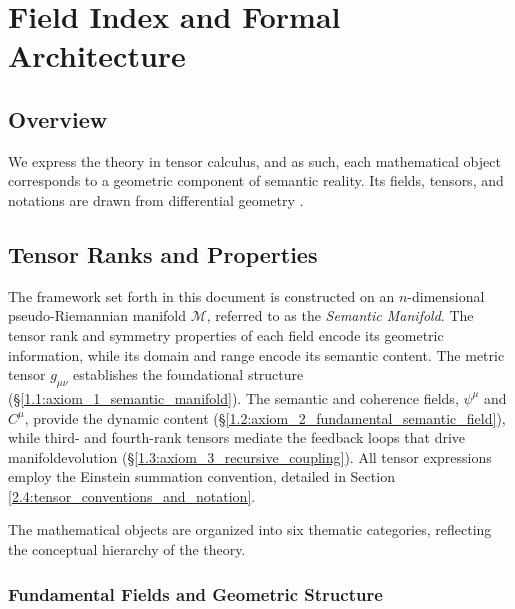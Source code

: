 \chapter{Field Index and Formal Architecture}
\label{2:field_index_and_formal_architecture}


\section{Overview}
\label{2.1:overview}

We express the theory in tensor calculus, and as such, each mathematical object corresponds to a geometric component of semantic reality. Its fields, tensors, and notations are drawn from differential geometry \autocite{Riemann1868, Lee2003}.


\section{Tensor Ranks and Properties}
\label{2.2:tensor_ranks_and_properties}

The framework set forth in this document is constructed on an \(n\)-dimensional pseudo-Riemannian manifold \(\mathcal{M}\), referred to as the \textit{Semantic Manifold}. The tensor rank and symmetry properties of each field encode its geometric information, while its domain and range encode its semantic content. The metric tensor \(g_{\mu\nu}\) establishes the foundational structure (\S\ref{1.1:axiom_1_semantic_manifold}). The semantic and coherence fields, \(\psi^\mu\) and \(C^\mu\), provide the dynamic content (\S\ref{1.2:axiom_2_fundamental_semantic_field}), while third- and fourth-rank tensors mediate the feedback loops that drive manifoldevolution (\S\ref{1.3:axiom_3_recursive_coupling}). All tensor expressions employ the Einstein summation convention, detailed in Section \ref{2.4:tensor_conventions_and_notation}.

The mathematical objects are organized into six thematic categories, reflecting the conceptual hierarchy of the theory.


\subsection{Fundamental Fields and Geometric Structure}
\label{2.2.1:fundamental_fields_and_geometric_structure}

